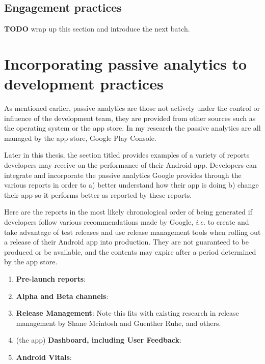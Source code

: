 \subsection{Engagement practices}

\textbf{TODO} wrap up this section and introduce the next batch.

\section{Incorporating passive analytics to development practices}
As mentioned earlier, passive analytics are those not actively under the control or influence of the development team, they are provided from other sources such as the operating system or the app store. In my research the passive analytics are all managed by the app store, Google Play Console.

Later in this thesis, the section titled \href{google_play_console_section}{\emph{}} provides examples of a variety of reports developers may receive on the performance of their Android app. Developers can integrate and incorporate the passive analytics Google provides through the various reports in order to a) better understand how their app is doing b) change their app so it performs better as reported by these reports.

Here are the reports in the most likely chronological order of being generated if developers follow various recommendations made by Google, \emph{i.e.} to create and take advantage of test releases and use release management tools when rolling out a release of their Android app into production. They are not guaranteed to be produced or be available, and the contents may expire after a period determined by the app store.

\begin{enumerate}
    \item \textbf{Pre-launch reports}: 
    \item \textbf{Alpha and Beta channels}:
    \item \textbf{Release Management}: Note this fits with existing research in release management by Shane Mcintosh and Guenther Ruhe, and others.
    
    \item (the app) \textbf{Dashboard, including User Feedback}:
    \item \textbf{Android Vitals}:
\end{enumerate}


